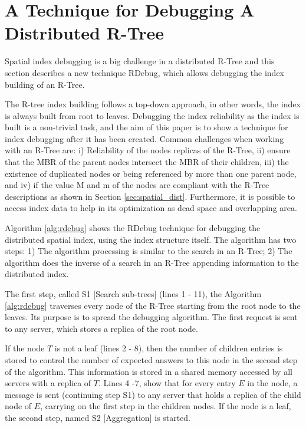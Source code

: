 \section{A Technique for Debugging A Distributed R-Tree}
\label{sec:rdebug}

	Spatial index debugging is a big challenge in a distributed R-Tree and this section describes a new technique RDebug, which allows debugging the index building of an R-Tree.
	
	The R-tree index building follows a top-down approach, in other words, the index is always built from root to leaves. Debugging the index reliability as the index is built is a non-trivial task, and the aim of this paper is to show a technique for index debugging after it has been created. Common challenges when working with an R-Tree are: i) Reliability of the nodes replicas of the R-Tree, ii) ensure that the MBR of the parent nodes intersect the MBR of their children, iii) the existence of duplicated nodes or being referenced by more than one parent node, and iv) if the value M and m of the nodes are compliant with the R-Tree descriptions as shown in Section \ref{sec:spatial_dist}. Furthermore, it is possible to access index data to help in its optimization as dead space and overlapping area.

	Algorithm \ref{alg:rdebug} shows the RDebug technique for debugging the distributed spatial index, using the index structure itself. The algorithm has two steps:
1) The algorithm processing is similar to the search in an R-Tree; 2) The algorithm does the inverse of a search in an R-Tree appending information to the distributed index.

	The first step, called S1 [Search sub-trees] (lines 1 - 11), the Algorithm \ref{alg:rdebug} traverses every node of the R-Tree starting from the root node to the leaves. Its purpose is to spread the debugging algorithm. The first request is sent to any server, which stores a replica of the root node.

	If the node $T$ is not a leaf (lines 2 - 8), then the number of children entries is stored to control the number of expected answers to this node in the second step of the algorithm. This information is stored in a shared memory accessed by all servers with a replica of $T$. Lines 4 -7, show that for every entry $E$ in the node, a message is sent (continuing step S1) to any server that holds a replica of the child node of $E$, carrying on the first step in the children nodes. If the node is a leaf, the second step, named S2 [Aggregation] is started.

